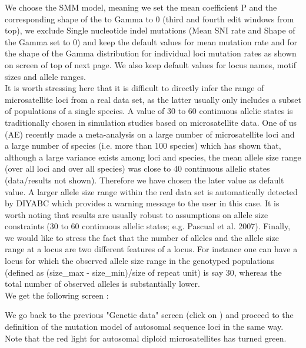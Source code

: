 We choose the SMM model, meaning we set the mean coefficient P and the corresponding shape of the to Gamma to 0 (third and fourth edit windows from top), we exclude Single nucleotide indel mutations (Mean SNI rate and Shape of the Gamma set to 0) and keep the default values for mean mutation rate and for the shape of the Gamma distribution for individual loci mutation rates as shown on screen of top of next page. We also keep default values for locus names, motif sizes and allele ranges.\\
It is worth stressing here that it is difficult to directly infer the range of microsatellite loci from a real data set, as the latter usually only includes a subset of populations of a single species. A value of 30 to 60 continuous allelic states is traditionally chosen in simulation studies based on microsatellite data. One of us (AE) recently made a meta-analysis on a large number of microsatellite loci and a large number of species (i.e. more than 100 species) which has shown that, although a large variance exists among loci and species, the mean allele size range (over all loci and over all species) was close to 40 continuous allelic states (data/results not shown). Therefore we have chosen the later value as default value. A larger allele size range within the real data set is automatically detected by DIYABC which provides a warning message to the user in this case. It is worth noting that results are usually robust to assumptions on allele size constraints (30 to 60 continuous allelic states; e.g. Pascual et al. 2007).
Finally, we would like to stress the fact that the number of alleles and the allele size range at a locus are two different features of a locus. For instance one can have a locus for which the observed allele size range in the genotyped populations (defined as (size\_max - size\_min)/size of repeat unit) is say 30, whereas the total number of observed alleles is substantially lower.\\

We get the following screen :



We go back to the previous "Genetic data" screen (click on ) and proceed to the definition of the mutation model of autosomal sequence loci in the same way. Note that the red light for autosomal diploid microsatellites has turned green.

